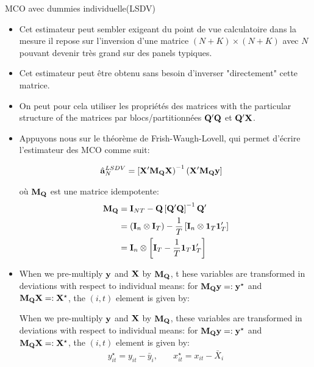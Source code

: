 \begin{frame}[allowframebreaks]{MCO avec dummies individuelle(LSDV)}
\begin{itemize}
    \item Cet estimateur peut sembler exigeant du point 
    de vue calculatoire dans la mesure il repose sur
     l'inversion d'une matrice $(N +K)\times (N+ K)$ avec $N$ 
     pouvant devenir très grand sur des panels typiques.
    
     \item Cet estimateur peut être obtenu sans besoin d'inverser  "directement" cette matrice. 

\item On peut pour cela utiliser les propriétés des matrices with the particular structure of the matrices par
 blocs/partitionnées $\mathbf Q^\prime\mathbf Q$ et $\mathbf Q^\prime\mathbf X$. 


\item Appuyons nous sur le théorème  de Frish-Waugh-Lovell,  qui permet d'écrire l'estimateur des MCO comme suit:

\begin{align*}
\hat{{\mathbf a}}^{LSDV}_N
&=
\left[
\mathbf X^\prime\mathbf M_\mathbf Q\mathbf X
\right)^{-1}
\left(
\mathbf X^\prime\mathbf M_\mathbf Q{\mathbf y}
\right]
\end{align*}

où  $\mathbf M_\mathbf Q$ est une matrice idempotente:
\begin{align*}
\mathbf M_\mathbf Q &=\mathbf{I}_{NT} - \mathbf Q\left[\mathbf Q^\prime\mathbf Q\right]^{-1}\mathbf Q^\prime\\
&= \left(\mathbf{I}_n\otimes \mathbf{I}_T\right) - \frac{1}{T}\left[\mathbf{I}_n \otimes{\mathbf 1}_T 
{\mathbf 1}_T^\prime\right]\\
&= \mathbf{I}_n\otimes\left[\mathbf{I}_T -  \frac{1}{T} {\mathbf 1}_T {\mathbf 1}_T^\prime\right]
\end{align*}



\item When we pre-multiply ${\mathbf y}$ and $\mathbf X$ by $\mathbf M_\mathbf Q$, t
hese variables are transformed in deviations with respect to individual means: 
for $\mathbf M_\mathbf Q {\mathbf y} =: {\mathbf y}^{\star}$ and 
$\mathbf M_\mathbf Q \mathbf X =: \mathbf X^{\star}$, the $(i, t)$ element is given by:





When we pre-multiply ${\mathbf y}$ and $\mathbf X$ by $\mathbf M_\mathbf Q$, 
these variables are transformed in deviations with respect to individual 
means: for $\mathbf M_\mathbf Q {\mathbf y} =: {\mathbf y}^{\star}$ and $\mathbf M_\mathbf Q \mathbf X =: \mathbf X^{\star}$, 
the $(i, t)$ element is given by:
\begin{align*}
y^{\star}_{it} = y_{it}-\bar{y}_i, &\quad  x^{\star}_{it} = x_{it}-\bar{X}_i
\end{align*}


\end{itemize}
\end{frame}

